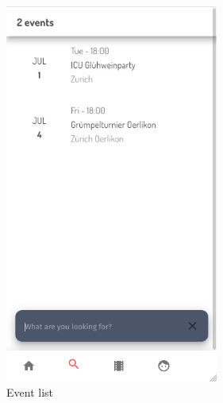 \begin{figure}[H]
    \centering
    \includegraphics[width=7cm]{images/event_list.png}
    \caption{Event list}
    \label{img:event-list}
\end{figure}

